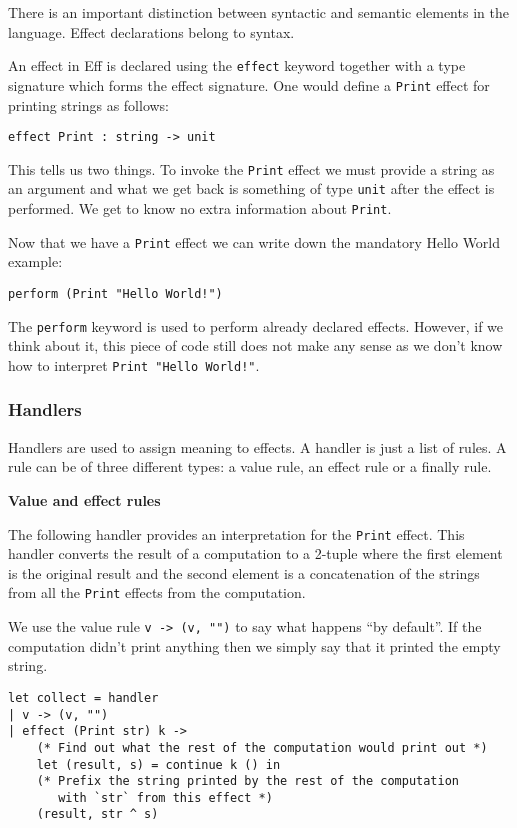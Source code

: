 \documentclass[class=article,crop=false,11pt]{standalone}
\begin{document}
There is an important distinction between syntactic and semantic elements in the language. Effect declarations belong to syntax.

An effect in Eff is declared using the \verb|effect| keyword together with a type signature which forms the effect signature. One would define a \verb|Print| effect for printing strings as follows:

\begin{verbatim}
effect Print : string -> unit
\end{verbatim}

This tells us two things. To invoke the \verb|Print| effect we must provide a string as an argument and what we get back is something of type \verb|unit| after the effect is performed. We get to know no extra information about \verb|Print|.

Now that we have a \verb|Print| effect we can write down the mandatory Hello World example:
\begin{verbatim}
perform (Print "Hello World!")
\end{verbatim}

The \verb|perform| keyword is used to perform already declared effects. However, if we think about it, this piece of code still does
not make any sense as we don't know how to interpret \verb|Print "Hello World!"|.

\subsubsection{Handlers}

Handlers are used to assign meaning to effects. A handler is just a list of rules. A rule can be of three different types: a value rule, an effect rule or a finally rule.

\textbf{Value and effect rules}

The following handler provides an interpretation for the \verb|Print| effect. This handler converts the result of a computation to a 2-tuple where the first element is the original result and the second
element is a concatenation of the strings from all the \verb|Print| effects from the computation.

We use the value rule \verb|v -> (v, "")| to say what happens ``by default''. If the computation didn't print anything then we simply say that it printed the empty string.

\begin{verbatim}
let collect = handler
| v -> (v, "")
| effect (Print str) k ->
    (* Find out what the rest of the computation would print out *)
    let (result, s) = continue k () in
    (* Prefix the string printed by the rest of the computation 
       with `str` from this effect *)
    (result, str ^ s)
\end{verbatim}
\end{document}
